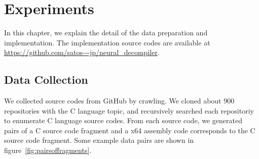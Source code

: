 \documentclass[senior,final,11pt]{iscs-thesis}
\begin{document}

\chapter{Experiments}
In this chapter, we explain the detail of the data preparation and implementation.
The implementation source codes are available at \url{https://github.com/satos---jp/neural_decompiler}.  

\section{Data Collection}
We collected source codes from GitHub \citep{github} by crawling.
We cloned about 900 repositories with the C language topic, 
and recursively searched each repositoriy to enumerate C language source codes.
From each source code, we generated pairs of a C source code fragment and a x64 assembly code corresponds to the C source code fragment.
Some example data pairs are shown in figure~\ref{fig:pairsoffragments}. 
\end{document}
